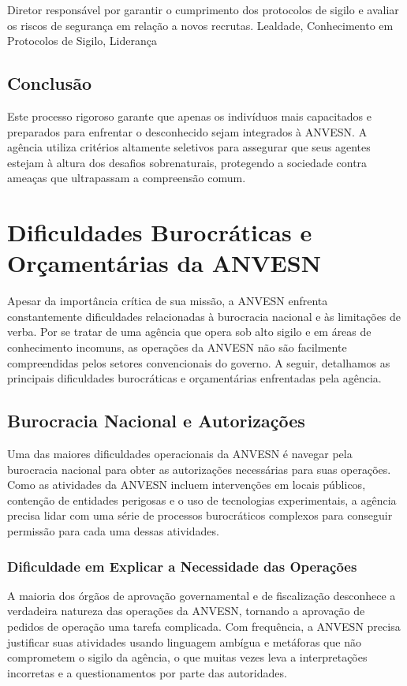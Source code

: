 {Diretor responsável por garantir o cumprimento dos protocolos de sigilo e avaliar os riscos de segurança em relação a novos recrutas.}
{Lealdade, Conhecimento em Protocolos de Sigilo, Liderança}

\section{Conclusão}

Este processo rigoroso garante que apenas os indivíduos mais capacitados e preparados para enfrentar o desconhecido sejam integrados à ANVESN. A agência utiliza critérios altamente seletivos para assegurar que seus agentes estejam à altura dos desafios sobrenaturais, protegendo a sociedade contra ameaças que ultrapassam a compreensão comum.

\chapter{Dificuldades Burocráticas e Orçamentárias da ANVESN}

Apesar da importância crítica de sua missão, a ANVESN enfrenta constantemente dificuldades relacionadas à burocracia nacional e às limitações de verba. Por se tratar de uma agência que opera sob alto sigilo e em áreas de conhecimento incomuns, as operações da ANVESN não são facilmente compreendidas pelos setores convencionais do governo. A seguir, detalhamos as principais dificuldades burocráticas e orçamentárias enfrentadas pela agência.

\section{Burocracia Nacional e Autorizações}
Uma das maiores dificuldades operacionais da ANVESN é navegar pela burocracia nacional para obter as autorizações necessárias para suas operações. Como as atividades da ANVESN incluem intervenções em locais públicos, contenção de entidades perigosas e o uso de tecnologias experimentais, a agência precisa lidar com uma série de processos burocráticos complexos para conseguir permissão para cada uma dessas atividades.

\subsection{Dificuldade em Explicar a Necessidade das Operações}
A maioria dos órgãos de aprovação governamental e de fiscalização desconhece a verdadeira natureza das operações da ANVESN, tornando a aprovação de pedidos de operação uma tarefa complicada. Com frequência, a ANVESN precisa justificar suas atividades usando linguagem ambígua e metáforas que não comprometem o sigilo da agência, o que muitas vezes leva a interpretações incorretas e a questionamentos por parte das autoridades.

